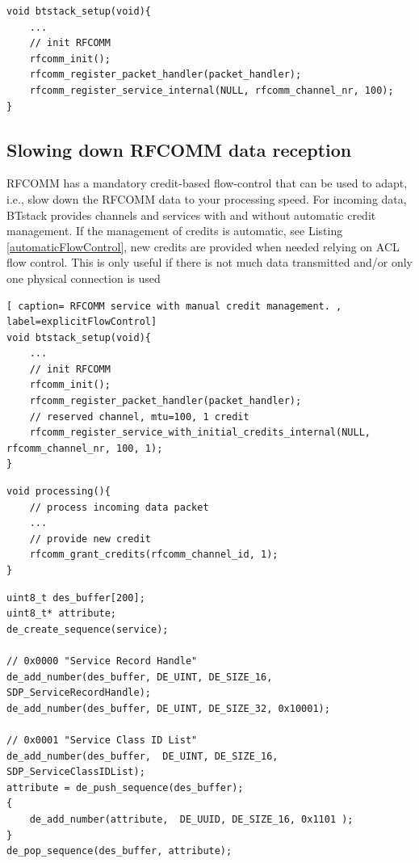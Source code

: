\documentclass[a4paper,titlepage,oneside,12pt]{amsart} %
\begin{document}
\begin{lstlisting}[caption= RFCOMM service with automatic credit management. , label=automaticFlowControl]
void btstack_setup(void){
    ...
    // init RFCOMM
    rfcomm_init();
    rfcomm_register_packet_handler(packet_handler);
    rfcomm_register_service_internal(NULL, rfcomm_channel_nr, 100); 
}
\end{lstlisting}

\subsection{Slowing down RFCOMM data reception}
\label{sec:manualCredits}
RFCOMM has a mandatory credit-based flow-control that can be used to adapt, i.e., slow down the RFCOMM data to your processing speed. 
For incoming data, BTstack provides channels and services with and without automatic credit management. 
If the management of credits is automatic, see Listing \ref{automaticFlowControl},  new credits are provided when needed relying on ACL flow control. This is only useful if there is not much data transmitted and/or only one physical connection is used




\begin{lstlisting}[ caption= RFCOMM service with manual credit management. , label=explicitFlowControl]
void btstack_setup(void){
    ...
    // init RFCOMM
    rfcomm_init();
    rfcomm_register_packet_handler(packet_handler);
    // reserved channel, mtu=100, 1 credit
    rfcomm_register_service_with_initial_credits_internal(NULL, rfcomm_channel_nr, 100, 1);  
}
\end{lstlisting}

\begin{lstlisting}[caption= Providing new credits , label=NewCredits]
void processing(){
    // process incoming data packet
    ... 
    // provide new credit
    rfcomm_grant_credits(rfcomm_channel_id, 1);
}
\end{lstlisting}

\begin{lstlisting}[caption=Creating record with the data element (\emph{de\_*}) functions., label=sdpCreate]
uint8_t des_buffer[200];
uint8_t* attribute;
de_create_sequence(service);
    
// 0x0000 "Service Record Handle"
de_add_number(des_buffer, DE_UINT, DE_SIZE_16, SDP_ServiceRecordHandle);
de_add_number(des_buffer, DE_UINT, DE_SIZE_32, 0x10001);
    
// 0x0001 "Service Class ID List"
de_add_number(des_buffer,  DE_UINT, DE_SIZE_16, SDP_ServiceClassIDList);
attribute = de_push_sequence(des_buffer);
{
    de_add_number(attribute,  DE_UUID, DE_SIZE_16, 0x1101 );
}
de_pop_sequence(des_buffer, attribute);
\end{lstlisting}
\end{document}
